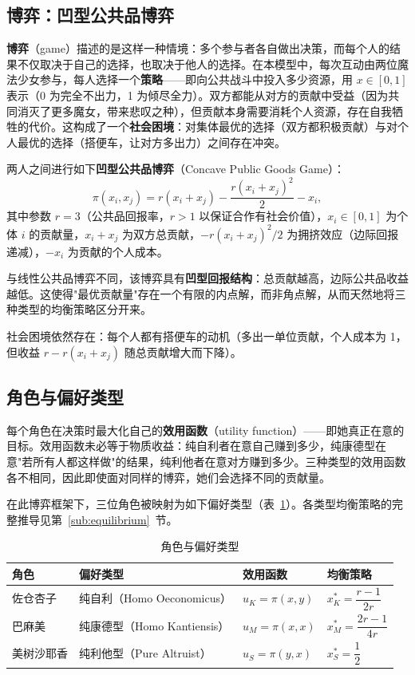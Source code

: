 \documentclass[12pt]{article}
\begin{document}
\subsection{博弈：凹型公共品博弈}

\textbf{博弈}（game）描述的是这样一种情境：多个参与者各自做出决策，而每个人的结果不仅取决于自己的选择，也取决于他人的选择。在本模型中，每次互动由两位魔法少女参与，每人选择一个\textbf{策略}——即向公共战斗中投入多少资源，用 $x \in [0,1]$ 表示（0 为完全不出力，1 为倾尽全力）。双方都能从对方的贡献中受益（因为共同消灭了更多魔女，带来悲叹之种），但贡献本身需要消耗个人资源，存在自我牺牲的代价。这构成了一个\textbf{社会困境}：对集体最优的选择（双方都积极贡献）与对个人最优的选择（搭便车，让对方多出力）之间存在冲突。

两人之间进行如下\textbf{凹型公共品博弈}（Concave Public Goods Game）：
\begin{equation}
    \pi(x_i, x_j) = r(x_i + x_j) - \frac{r(x_i + x_j)^2}{2} - x_i,
    \label{eq:pgg}
\end{equation}
其中参数 $r = 3$（公共品回报率，$r > 1$ 以保证合作有社会价值），$x_i \in [0,1]$ 为个体 $i$ 的贡献量，$x_i + x_j$ 为双方总贡献，$-r(x_i+x_j)^2/2$ 为拥挤效应（边际回报递减），$-x_i$ 为贡献的个人成本。

与线性公共品博弈不同，该博弈具有\textbf{凹型回报结构}：总贡献越高，边际公共品收益越低。这使得"最优贡献量"存在一个有限的内点解，而非角点解，从而天然地将三种类型的均衡策略区分开来。

社会困境依然存在：每个人都有搭便车的动机（多出一单位贡献，个人成本为 1，但收益 $r - r(x_i+x_j)$ 随总贡献增大而下降）。

\subsection{角色与偏好类型}

每个角色在决策时最大化自己的\textbf{效用函数}（utility function）——即她真正在意的目标。效用函数未必等于物质收益：纯自利者在意自己赚到多少，纯康德型在意"若所有人都这样做"的结果，纯利他者在意对方赚到多少。三种类型的效用函数各不相同，因此即使面对同样的博弈，她们会选择不同的贡献量。

在此博弈框架下，三位角色被映射为如下偏好类型（表~\ref{tab:types}）。各类型均衡策略的完整推导见第~\ref{sub:equilibrium}~节。

\begin{table}[H]
    \centering
    \caption{角色与偏好类型}
    \label{tab:types}
    \begin{tabular}{llll}
        \toprule
        角色 & 偏好类型 & 效用函数 & 均衡策略 \\
        \midrule
        佐仓杏子 & 纯自利（Homo Oeconomicus） & $u_K = \pi(x, y)$ & $x_K^* = \dfrac{r-1}{2r}$ \\[8pt]
        巴麻美   & 纯康德型（Homo Kantiensis） & $u_M = \pi(x, x)$ & $x_M^* = \dfrac{2r-1}{4r}$ \\[8pt]
        美树沙耶香 & 纯利他型（Pure Altruist）  & $u_S = \pi(y, x)$ & $x_S^* = \dfrac{1}{2}$ \\
        \bottomrule
    \end{tabular}
\end{table}
\end{document}
